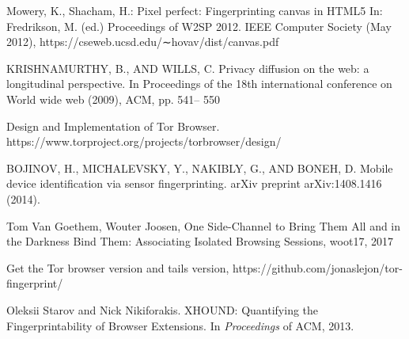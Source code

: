 \documentclass[conference]{IEEEtran}
\begin{document}

%
%
%
\begin{thebibliography}{1}

Mowery, K., Shacham, H.: Pixel perfect: Fingerprinting canvas in HTML5 In:
Fredrikson, M. (ed.) Proceedings of W2SP 2012. IEEE Computer Society (May
2012), https://cseweb.ucsd.edu/∼hovav/dist/canvas.pdf

KRISHNAMURTHY, B., AND WILLS, C. Privacy diffusion on the
web: a longitudinal perspective. In Proceedings of the 18th international
conference on World wide web (2009), ACM, pp. 541–
550

Design and Implementation of Tor Browser.
https://www.torproject.org/projects/torbrowser/design/

BOJINOV, H., MICHALEVSKY, Y., NAKIBLY, G., AND BONEH,
D. Mobile device identification via sensor fingerprinting. arXiv
preprint arXiv:1408.1416 (2014).

Tom Van Goethem, Wouter Joosen, One Side-Channel to Bring Them All and in the Darkness Bind Them:
Associating Isolated Browsing Sessions, woot17, 2017

Get the Tor browser version and tails version, https://github.com/jonaslejon/tor-fingerprint/

Oleksii Starov and Nick Nikiforakis. XHOUND: Quantifying the Fingerprintability of Browser Extensions. In \textit{Proceedings} of ACM, 2013.
  

\end{thebibliography}



% 
\end{document}
